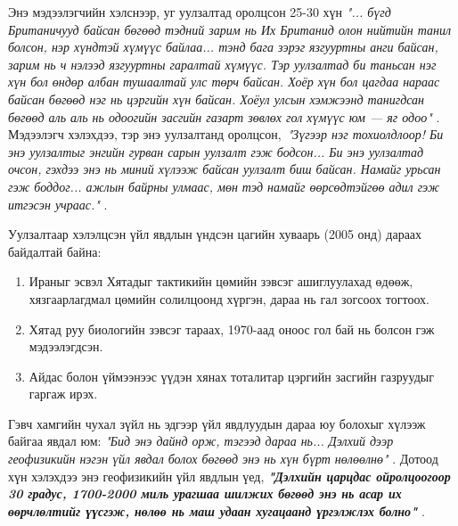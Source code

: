 \documentclass[10pt,twocolumn,letterpaper]{article}
\begin{document}
Энэ мэдээлэгчийн хэлснээр, уг уулзалтад оролцсон 25-30 хүн \textit{"... бүгд Британичууд байсан бөгөөд тэдний зарим нь Их Британид олон нийтийн танил болсон, нэр хүндтэй хүмүүс байлаа... тэнд бага зэрэг язгууртны анги байсан, зарим нь ч нэлээд язгууртны гаралтай хүмүүс. Тэр уулзалтад би таньсан нэг хүн бол өндөр албан тушаалтай улс төрч байсан. Хоёр хүн бол цагдаа нараас байсан бөгөөд нэг нь цэргийн хүн байсан. Хоёул улсын хэмжээнд танигдсан бөгөөд аль аль нь одоогийн засгийн газарт зөвлөх гол хүмүүс юм — яг одоо"} \cite{4}. Мэдээлэгч хэлэхдээ, тэр энэ уулзалтанд оролцсон,\ \textit{"Зүгээр нэг тохиолдлоор! Би энэ уулзалтыг энгийн гурван сарын уулзалт гэж бодсон... Би энэ уулзалтад очсон, гэхдээ энэ нь миний хүлээж байсан уулзалт биш байсан. Намайг урьсан гэж боддог... ажлын байрны улмаас, мөн тэд намайг өөрсөдтэйгөө адил гэж итгэсэн учраас."} \cite{4}.

Уулзалтаар хэлэлцсэн үйл явдлын үндсэн цагийн хуваарь (2005 онд) дараах байдалтай байна:

\begin{flushleft}

\begin{enumerate}
    \item Ираныг эсвэл Хятадыг тактикийн цөмийн зэвсэг ашиглуулахад өдөөж, хязгаарлагдмал цөмийн солилцоонд хүргэн, дараа нь гал зогсоох тогтоох.
    \item Хятад руу биологийн зэвсэг тараах, 1970-аад оноос гол бай нь болсон гэж мэдээлэгдсэн.
    \item Айдас болон үймээнээс үүдэн хянах тоталитар цэргийн засгийн газруудыг гаргаж ирэх.
\end{enumerate}
\end{flushleft}

Гэвч хамгийн чухал зүйл нь эдгээр үйл явдлуудын дараа юу болохыг хүлээж байгаа явдал юм: \textit{"Бид энэ дайнд орж, тэгээд дараа нь... Дэлхий дээр геофизикийн нэгэн үйл явдал болох бөгөөд энэ нь хүн бүрт нөлөөлнө"} \cite{4}. Дотоод хүн хэлэхдээ энэ геофизикийн үйл явдлын үед, \textit{\textbf{"Дэлхийн царцдас ойролцоогоор 30 градус, 1700-2000 миль урагшаа шилжих бөгөөд энэ нь асар их өөрчлөлтийг үүсгэж, нөлөө нь маш удаан хугацаанд үргэлжлэх болно"}} \cite{4}.
\end{document}
